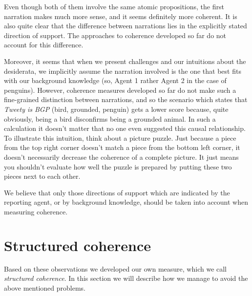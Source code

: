 \documentclass[10pt,]{scrartcl}
\begin{document}
\vspace{2mm}

\noindent Even though both of them involve the same atomic propositions,
the first narration makes much more sense, and it seems definitely more
coherent. It is also quite clear that the difference between narrations
lies in the explicitly stated direction of support. The approaches to
coherence developed so far do not account for this difference.

Moreover, it seems that when we present challenges and our intuitions
about the desiderata, we implicitly assume the narration involved is the
one that best fits with our background knowledge (so, Agent 1 rather
Agent 2 in the case of penguins). However, coherence measures developed
so far do not make such a fine-grained distinction between narrations,
and so the scenario which states that \textit{Tweety is BGP} (bird,
grounded, penguin) gets a lower score because, quite obviously, being a
bird disconfirms being a grounded animal. In such a calculation it
doesn't matter that no one even suggested this causal relationship. To
illustrate this intuition, think about a picture puzzle. Just because a
piece from the top right corner doesn't match a piece from the bottom
left corner, it doesn't necessarily decrease the coherence of a complete
picture. It just means you shouldn't evaluate how well the puzzle is
prepared by putting these two pieces next to each other.

We believe that only those directions of support which are indicated by
the reporting agent, or by background knowledge, should be taken into
account when measuring coherence.


\section{Structured coherence}\label{sec:structured}


Based on these observations we developed our own measure, which we call
\textit{structured coherence}. In this section we will describe how we
manage to avoid the above mentioned problems.  
\end{document}

